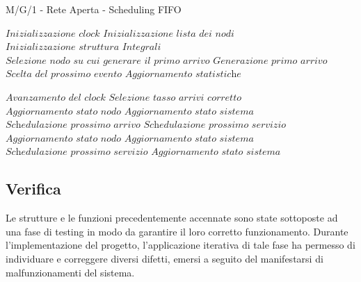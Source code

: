 \documentclass{article}
\begin{document}
\begin{algorithm}[H]
\caption{M/G/1 - Rete Aperta - Scheduling FIFO}\label{algo1}
\begin{algorithmic}[1]
\State $\textit{Inizializzazione clock}$
\State $\textit{Inizializzazione lista dei nodi}$
\State $\textit{Inizializzazione struttura Integrali}$
\State $\textit{Selezione nodo su cui generare il primo arrivo}$
\State $\textit{Generazione primo arrivo}$
  \State $\textit{Scelta del prossimo evento}$
      \State $\textit{Aggiornamento statistiche}$
    \EndIf

  \EndFor
  \State $\textit{Avanzamento del clock}$
   
      \State $\textit{Selezione tasso arrivi corretto}$
    \EndIf
    \State $\textit{Aggiornamento stato nodo}$
    \State $\textit{Aggiornamento stato sistema}$
    \State $\textit{Schedulazione prossimo arrivo}$
      \State $\textit{Schedulazione prossimo servizio}$
    \EndIf
  \Else  {}
    \State $\textit{Aggiornamento stato nodo}$
      \State $\textit{Aggiornamento stato sistema}$
    \EndIf
      \State $\textit{Schedulazione prossimo servizio}$
    \EndIf
        \State $\textit{Aggiornamento stato sistema}$
      \EndIf
    \EndIf
  \EndIf
\EndWhile
\EndProcedure
\end{algorithmic}
\end{algorithm}


\subsection{Verifica}
Le strutture e le funzioni precedentemente accennate sono state sottoposte ad una fase di testing in modo da garantire il loro corretto funzionamento. Durante l'implementazione del progetto, l'applicazione iterativa di tale fase ha permesso di individuare e correggere diversi difetti, emersi a seguito del manifestarsi di malfunzionamenti del sistema.
\end{document}
